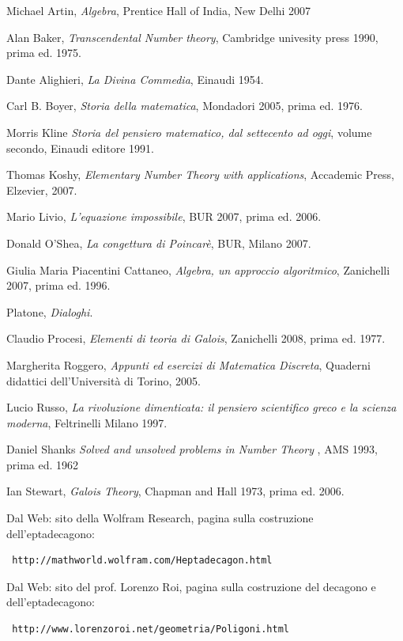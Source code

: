 \documentclass[a4paper,11pt,oneside]{report}
\begin{document}
\begin{thebibliography}{21}

Michael Artin, \emph{Algebra}, Prentice Hall of India, New Delhi 2007 

Alan Baker, \emph{Transcendental Number theory}, Cambridge univesity press 1990, prima ed. 1975.

Dante Alighieri, \emph{La Divina Commedia}, Einaudi 1954.

Carl B. Boyer, \emph{Storia della matematica}, Mondadori 2005, prima ed. 1976.

Morris Kline \emph{Storia del pensiero matematico, dal settecento ad oggi}, volume secondo, Einaudi editore 1991.

Thomas Koshy, \emph{Elementary Number Theory with applications}, Accademic Press, Elzevier, 2007.

Mario Livio, \emph{L'equazione impossibile}, BUR 2007, prima ed. 2006.

Donald O'Shea, \emph{La congettura di Poincarè}, BUR, Milano 2007.

Giulia Maria Piacentini Cattaneo, \emph{Algebra, un approccio algoritmico}, Zanichelli 2007, prima ed. 1996.

Platone, \emph{Dialoghi}.

Claudio Procesi, \emph{Elementi di teoria di Galois}, Zanichelli 2008, prima ed. 1977.

Margherita Roggero, \emph{Appunti ed esercizi di Matematica Discreta}, Quaderni didattici dell'Università di Torino, 2005.

Lucio Russo, \emph{La rivoluzione dimenticata: il pensiero scientifico greco e la scienza moderna}, Feltrinelli Milano 1997.

Daniel Shanks \emph{Solved and unsolved problems in Number Theory }, AMS 1993, prima ed. 1962

Ian Stewart, \emph{Galois Theory}, Chapman and Hall 1973, prima ed. 2006.

Dal Web: sito della Wolfram Research, pagina sulla costruzione dell'eptadecagono:  \begin{verbatim} http://mathworld.wolfram.com/Heptadecagon.html \end{verbatim}

Dal Web: sito del prof. Lorenzo Roi, pagina sulla costruzione del decagono e dell'eptadecagono: \begin{verbatim} http://www.lorenzoroi.net/geometria/Poligoni.html \end{verbatim}


\end{thebibliography}
\end{document}
